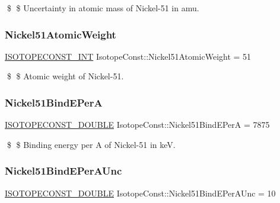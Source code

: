 \$ \$ Uncertainty in atomic mass of Nickel-\/51 in amu. \mbox{\label{group___isotope_const-_nickel-_ni51_ga63a63c923e421df8ff40fb9c1c5acc86}} 
\subsubsection{\texorpdfstring{Nickel51\+Atomic\+Weight}{Nickel51AtomicWeight}}
{\footnotesize\ttfamily \mbox{\hyperlink{group___isotope_const-_macros_ga5f18360b3e99483a35c32d789e62621c}{I\+S\+O\+T\+O\+P\+E\+C\+O\+N\+S\+T\+\_\+\+I\+NT}} Isotope\+Const\+::\+Nickel51\+Atomic\+Weight = 51}

\$ \$ Atomic weight of Nickel-\/51. \mbox{\label{group___isotope_const-_nickel-_ni51_ga0fccc07413975549e5bc7c3e219dc9da}} 
\subsubsection{\texorpdfstring{Nickel51\+Bind\+E\+PerA}{Nickel51BindEPerA}}
{\footnotesize\ttfamily \mbox{\hyperlink{group___isotope_const-_macros_ga8f45a7272ce02c0b4c65c44636ed719a}{I\+S\+O\+T\+O\+P\+E\+C\+O\+N\+S\+T\+\_\+\+D\+O\+U\+B\+LE}} Isotope\+Const\+::\+Nickel51\+Bind\+E\+PerA = 7875}

\$ \$ Binding energy per A of Nickel-\/51 in keV. \mbox{\label{group___isotope_const-_nickel-_ni51_gad6f0fc752ab03315d8477432b42b6263}} 
\subsubsection{\texorpdfstring{Nickel51\+Bind\+E\+Per\+A\+Unc}{Nickel51BindEPerAUnc}}
{\footnotesize\ttfamily \mbox{\hyperlink{group___isotope_const-_macros_ga8f45a7272ce02c0b4c65c44636ed719a}{I\+S\+O\+T\+O\+P\+E\+C\+O\+N\+S\+T\+\_\+\+D\+O\+U\+B\+LE}} Isotope\+Const\+::\+Nickel51\+Bind\+E\+Per\+A\+Unc = 10}

